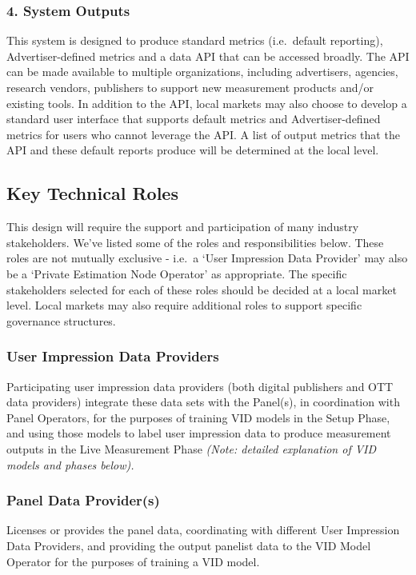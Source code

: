 \documentclass[]{article}
\begin{document}
\subsubsection{4. System Outputs}
This system is designed to produce standard metrics (i.e.~default reporting), Advertiser-defined metrics and a data API that can be accessed broadly. The API can be made available to multiple
organizations, including advertisers, agencies, research vendors, publishers to support new measurement products and/or existing tools. In addition to the API, local markets may also choose to develop a standard
user interface that supports default metrics and Advertiser-defined metrics for users who cannot leverage the API. A list of output metrics that the API and these default reports produce will be determined at the
local level.

\subsection{Key Technical Roles}

This design will require the support and participation of many industry
stakeholders. We've listed some of the roles and responsibilities below.
These roles are not mutually exclusive - i.e.~a `User Impression Data
Provider' may also be a `Private Estimation Node Operator' as
appropriate. The specific stakeholders selected for each of these roles
should be decided at a local market level. Local markets may also
require additional roles to support specific governance structures.

\subsubsection{User Impression Data Providers}

Participating user impression data providers (both digital publishers and OTT data providers) integrate these data sets with the Panel(s), in coordination with Panel Operators, for the purposes of training VID
models in the Setup Phase, and using those models to label user impression data to produce measurement outputs in the Live Measurement Phase \emph{(Note: detailed explanation of VID models and phases
below).}

\subsubsection{Panel Data Provider(s)}
Licenses or provides the panel data, coordinating with different User Impression Data Providers, and providing the output panelist data to the VID Model Operator for the purposes of training a VID model.
\end{document}
